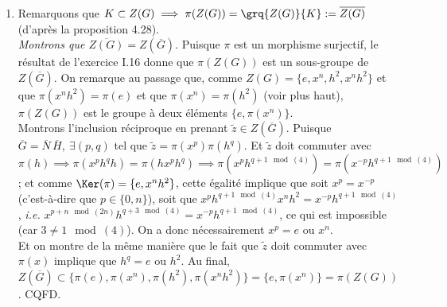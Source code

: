 \begin{enumerate}[resume]
    \emph{Montrons que $\overline{G} = \overline{N}\, \overline{H} $, que $\card{\overline{N} \cap\overline{H}} = 2$ et que $\card{\overline{G}} = 4n$}. Le produit semi-direct  $G = N \times_{\varphi} H$ signifie notamment que $G$ peut être considéré comme le groupe produit $NH$ (muni d'une loi "particulière") ; et puisque $\pi$ est un morphisme,
    on en tire $\pi(G) = \pi(N)\pi(H)$, \textit{i.e.} $\overline{G} = \overline{N}\, \overline{H} $.\\
    L'égalité (dans $G$) $x^n\, x^nh^2 = h^2$ donne $\pi(x^n) \pi(x^nh^2) = \pi(h^2)$ \textit{i.e.} $\pi(x^n) = \pi(h^2)$ car $x^nh^2 \in \Ker(\pi)$. Or $\pi(x^n)\in \overline{N}$ et $\pi(h^2) \in \overline{H}$ donc $\overline{N}\cap \overline{H}$ contient $\pi(x^n)$ en plus du neutre de $\overline{G}$.\\
    Mais il n'y a pas d'autre élément dans $\overline{N}\cap \overline{H}$ : en effet, avec les isomorphismes $\overline{N} \iso N$ et $\overline{H} \iso H$, un élément $\tilde{z}$ de $\overline{N}\cap \overline{H}$ est de la forme $\tilde{z}= \pi(x^p) = \pi(h^q)$. 
    Et on établit facilement que $x^p h^{-q} \in \Ker(\pi) \implies p=q=0 $ ou $p=n$ et $q=2$. Ainsi on a bien $\card{\overline{N} \cap\overline{H}} = 2$.\\
    Enfin, puisqu'on a $\overline{G} = \overline{N}\, \overline{H} $ avec $\card{\overline{N}}=2n$, $\card{\overline{H}}=4$ et $\card{\overline{N} \cap\overline{H}} = 2$, on déduit du résultat de l'exercice II.3 que 
    $\card{\overline{G}} = \frac{2n\times 4}{2} = 4n$. 

    \item Remarquons que $K\subset Z(G) \implies \pi(Z(G)) = \grq{Z(G)}{K} := \overline{Z(G)}$ (d'après la proposition 4.28).\\
    \emph{Montrons que $\overline{Z(G)} = Z\left(\overline{G}\right)$}. Puisque $\pi$ est un morphisme surjectif, le résultat de l'exercice I.16 donne que $\pi(Z(G))$ est un sous-groupe de $Z\left(\overline{G}\right)$.
    On remarque au passage que, comme $Z(G) = \{e, x^n, h^2, x^nh^2\}$ et que $\pi(x^nh^2) = \pi(e)$ et que $\pi(x^n) = \pi(h^2)$ (voir plus haut),  $\pi(Z(G))$ est le groupe à deux éléments $\{e, \pi(x^n)\}$.\\
    Montrons l'inclusion réciproque en prenant $\tilde{z} \in  Z\left(\overline{G}\right)$. Puisque $\overline{G} = \overline{N}\, \overline{H},~ \exists (p,q)$ tel que $\tilde{z}=\pi(x^p)\pi(h^q)$.
    Et $\tilde{z}$ doit commuter avec $\pi(h)\implies \pi(x^ph^q h) = \pi(h x^ph^q) \implies \pi(x^p h^{q+1 \mod(4)}) = \pi(x^{-p}h^{q+1 \mod(4)})$ ; et comme $\Ker(\pi) = \{e, x^nh^2\}$, cette égalité implique que 
    soit $x^p = x^{-p}$ (c'est-à-dire que $p\in \{0,n\}$), soit que $x^p h^{q+1 \mod(4)} x^nh^2 = x^{-p}h^{q+1 \mod(4)}$, \textit{i.e.} $x^{p+n \mod(2n)} h^{q+3 \mod(4)}= x^{-p}h^{q+1 \mod(4)}$, ce qui est impossible (car $3\neq 1 \mod(4)$). On a donc nécessairement $x^p = e$ ou $x^n$.\\
    Et on montre de la même manière que le fait que  $\tilde{z}$ doit commuter avec $\pi(x)$ implique que $h^q = e$ ou $h^2$. Au final, $Z\left(\overline{G}\right) \subset \{\pi(e), \pi(x^n), \pi(h^2), \pi(x^nh^2)\} = \{e, \pi(x^n)\} = \pi(Z(G))$. CQFD.\smallskip


\end{enumerate}
